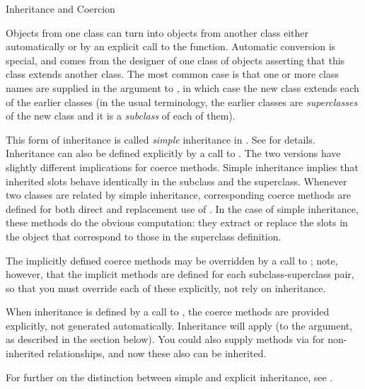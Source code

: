 \begin{Section}{Inheritance and Coercion}

Objects from one class can turn into objects from another class
either automatically or by an explicit call to the 
function.  Automatic conversion is special, and comes from the
designer of one class of objects asserting that this class extends
another class.  The most common case is that one or more class names
are supplied in the  argument to , in
which case the new class extends each of the earlier classes (in the
usual terminology, the earlier classes are \emph{superclasses} of
the new class and it is a \emph{subclass} of each of them).

This form of inheritance is called \emph{simple} inheritance in \R{}.
See  for details.
Inheritance can also be defined explicitly by a call to
.
The two versions have slightly different implications for coerce methods.
Simple inheritance implies that inherited slots behave identically in the subclass and the superclass.
Whenever two classes are related by simple inheritance, corresponding coerce methods
are defined for both direct and replacement use of .
In the case of simple inheritance, these methods do the obvious
computation:  they extract or replace the slots in the object that
correspond to those in the superclass definition.

The implicitly defined coerce methods may be overridden by a call
to ; note, however, that the implicit methods are defined for each
subclass-superclass pair, so that you must override each of these
explicitly, not rely on inheritance.

When inheritance is defined by a call to , the coerce methods are provided explicitly, not generated automatically.
Inheritance will apply (to the  argument, as described in  the section below).
You could also supply methods via  for non-inherited relationships, and now these also can be inherited.

For further on the distinction between simple and explicit inheritance, see .

\end{Section}
%
